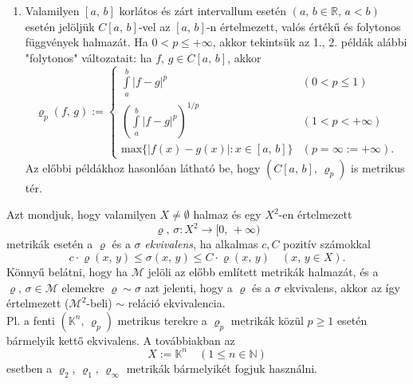 \documentclass[12pt]{article}
\newcommand{\R}{\mathbb{R}}
\newcommand{\N}{\mathbb{N}}
\newcommand{\K}{\mathbb{K}}
\begin{document}
\begin{enumerate}
        \item Valamilyen $[a, \, b]$ korlátos és zárt intervallum esetén $(a, \, b \in \R, \, a < b)$ esetén jelöljük $C[a, \, b]$-vel az $[a, \, b]$-n értelmezett, valós értékű és folytonos függvények halmazát. Ha $0 < p \leq + \infty$, akkor tekintsük az 1., 2. példák alábbi "folytonos" változatait: ha $f, \, g \in C[a, \, b]$, akkor
        \[
            \varrho_p(f, \, g) :=
            \begin{cases}
                \displaystyle \int\limits_a^b |f-g|^p & (0 < p \leq 1) \\
                \displaystyle \left( \int\limits_a^b |f-g|^p \right)^{1/p} & (1 < p < + \infty) \\
                \text{max}\{ |f(x) - g(x)| : x \in [a, \, b] \} & (p = \infty := + \infty).
            \end{cases}
        \]
        Az előbbi példákhoz hasonlóan látható be, hogy $(C[a, \, b], \, \varrho_p)$ is metrikus tér.
    \end{enumerate}

    Azt mondjuk, hogy valamilyen $X \neq \emptyset$ halmaz és egy $X^2$-en értelmezett
    \[
        \varrho, \, \sigma : X^2 \to [0, \, +\infty)
    \]
    metrikák esetén a $\varrho$ és a $\sigma$ \textit{ekvivalens}, ha alkalmas $c, C$ pozitív számokkal
    \[
        c \cdot \varrho(x, \, y) \leq \sigma(x, \, y) \leq C \cdot \varrho(x, \, y) \quad (x, \, y \in X).
    \]
    Könnyű belátni, hogy ha $\mathcal{M}$ jelöli az előbb említett metrikák halmazát, és a $\varrho, \, \sigma \in \mathcal{M}$ elemekre $\varrho \sim \sigma$ azt jelenti, hogy a $\varrho$ és a $\sigma$ ekvivalens, akkor az így értelmezett ($\mathcal{M}^2$-beli) $\sim$ reláció ekvivalencia.\\

    Pl. a fenti $(\K^n, \, \varrho_p)$ metrikus terekre a $\varrho_p$ metrikák közül $p \geq 1$ esetén bármelyik kettő ekvivalens. A továbbiakban az
    \[
        X := \K^n \quad (1 \leq n \in \N)
    \]
    esetben a $\varrho_2, \, \varrho_1, \, \varrho_\infty$ metrikák bármelyikét fogjuk használni.
\end{document}
